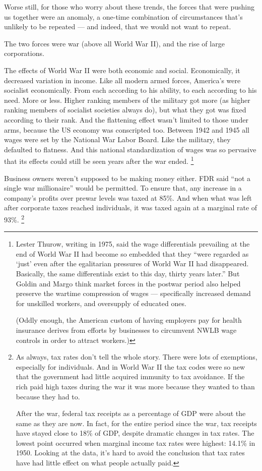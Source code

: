 \documentclass[12pt]{book}
\begin{document}
Worse still, for those who worry about these trends, the forces that
were pushing us together were an anomaly, a one-time combination of
circumstances that's unlikely to be repeated --- and indeed, that we
would not want to repeat.

The two forces were war (above all World War II), and the rise of large
corporations.

The effects of World War II were both economic and social. Economically,
it decreased variation in income. Like all modern armed forces,
America's were socialist economically. From each according to his
ability, to each according to his need. More or less. Higher ranking
members of the military got more (as higher ranking members of socialist
societies always do), but what they got was fixed according to their
rank. And the flattening effect wasn't limited to those under arms,
because the US economy was conscripted too. Between 1942 and 1945 all
wages were set by the National War Labor Board. Like the military, they
defaulted to flatness. And this national standardization of wages was so
pervasive that its effects could still be seen years after the war
ended. \footnote{Lester Thurow, writing in 1975, said the wage differentials
prevailing at the end of World War II had become so embedded that they
``were regarded as `just' even after the egalitarian pressures of World
War II had disappeared. Basically, the same differentials exist to this
day, thirty years later.'' But Goldin and Margo think market forces in
the postwar period also helped preserve the wartime compression of wages
--- specifically increased demand for unskilled workers, and oversupply
of educated ones.

(Oddly enough, the American custom of having employers pay for health
insurance derives from efforts by businesses to circumvent NWLB wage
controls in order to attract workers.)}

Business owners weren't supposed to be making money either. FDR said
``not a single war millionaire'' would be permitted. To ensure that, any
increase in a company's profits over prewar levels was taxed at 85\%.
And when what was left after corporate taxes reached individuals, it was
taxed again at a marginal rate of 93\%. \footnote{As always, tax rates don't tell the whole story. There were lots
of exemptions, especially for individuals. And in World War II the tax
codes were so new that the government had little acquired immunity to
tax avoidance. If the rich paid high taxes during the war it was more
because they wanted to than because they had to.

After the war, federal tax receipts as a percentage of GDP were about
the same as they are now. In fact, for the entire period since the war,
tax receipts have stayed close to 18\% of GDP, despite dramatic changes
in tax rates. The lowest point occurred when marginal income tax rates
were highest: 14.1\% in 1950. Looking at the data, it's hard to avoid
the conclusion that tax rates have had little effect on what people
actually paid.}
\end{document}
